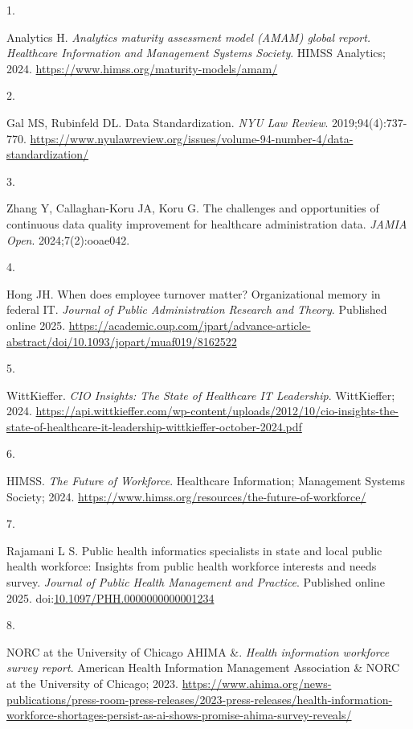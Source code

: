 \documentclass[
  american,
  11pt,
  letterpaper,
  oneside  ,captions=tableheading
]{scrartcl}
\newlength{\cslhangindent}
\newlength{\csllabelwidth}
\newenvironment{CSLReferences}[2] %
 {\begin{list}{}{%
  \setlength{\itemindent}{0pt}
  \setlength{\leftmargin}{0pt}
  \setlength{\parsep}{0pt}
  \ifodd #1
   \setlength{\leftmargin}{\cslhangindent}
   \setlength{\itemindent}{-1\cslhangindent}
  \fi
  \setlength{\itemsep}{#2\baselineskip}}}
 {\end{list}}
\newcommand{\CSLLeftMargin}[1]{\parbox[t]{\csllabelwidth}{\strut#1\strut}}
\newcommand{\CSLRightInline}[1]{\parbox[t]{\linewidth - \csllabelwidth}{\strut#1\strut}}
\begin{document}
\protect{}\label{refs}
\begin{CSLReferences}{0}{1}
\CSLLeftMargin{1. }%
\CSLRightInline{Analytics H. \emph{{Analytics maturity assessment model
(AMAM) global report. Healthcare Information and Management Systems
Society}}. {HIMSS} Analytics; 2024.
\url{https://www.himss.org/maturity-models/amam/}}

\CSLLeftMargin{2. }%
\CSLRightInline{Gal MS, Rubinfeld DL. {Data Standardization}. \emph{NYU
Law Review}. 2019;94(4):737-770.
\url{https://www.nyulawreview.org/issues/volume-94-number-4/data-standardization/}}

\CSLLeftMargin{3. }%
\CSLRightInline{Zhang Y, Callaghan-Koru JA, Koru G. {The challenges and
opportunities of continuous data quality improvement for healthcare
administration data}. \emph{JAMIA Open}. 2024;7(2):ooae042.}

\CSLLeftMargin{4. }%
\CSLRightInline{Hong JH. When does employee turnover matter?
Organizational memory in federal IT. \emph{Journal of Public
Administration Research and Theory}. Published online 2025.
\url{https://academic.oup.com/jpart/advance-article-abstract/doi/10.1093/jopart/muaf019/8162522}}

\CSLLeftMargin{5. }%
\CSLRightInline{WittKieffer. \emph{{CIO Insights: The State of
Healthcare IT Leadership}}. WittKieffer; 2024.
\url{https://api.wittkieffer.com/wp-content/uploads/2012/10/cio-insights-the-state-of-healthcare-it-leadership-wittkieffer-october-2024.pdf}}

\CSLLeftMargin{6. }%
\CSLRightInline{HIMSS. \emph{{The Future of Workforce}}. Healthcare
Information; Management Systems Society; 2024.
\url{https://www.himss.org/resources/the-future-of-workforce/}}

\CSLLeftMargin{7. }%
\CSLRightInline{Rajamani L S. {Public health informatics specialists in
state and local public health workforce: Insights from public health
workforce interests and needs survey}. \emph{Journal of Public Health
Management and Practice}. Published online 2025.
doi:\href{https://doi.org/10.1097/PHH.0000000000001234}{10.1097/PHH.0000000000001234}}

\CSLLeftMargin{8. }%
\CSLRightInline{NORC at the University of Chicago AHIMA \&.
\emph{{Health information workforce survey report}}. American Health
Information Management Association \& {NORC} at the University of
Chicago; 2023.
\url{https://www.ahima.org/news-publications/press-room-press-releases/2023-press-releases/health-information-workforce-shortages-persist-as-ai-shows-promise-ahima-survey-reveals/}}


\end{CSLReferences}
\end{document}
